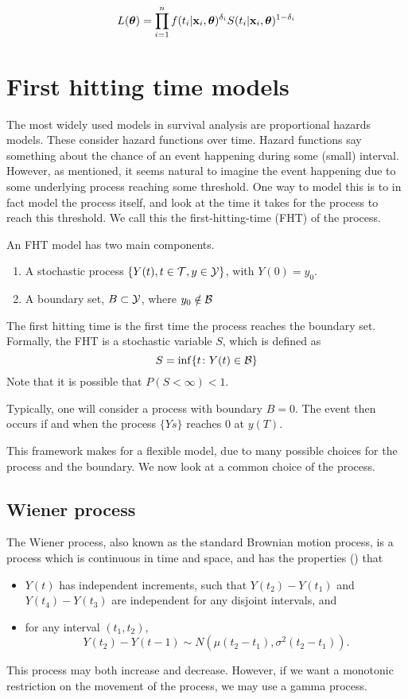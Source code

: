 \begin{equation}\label{eq:surv-lik}
    L(\boldsymbol{\theta})=\prod_{i=1}^n f(t_i|\mathbf{x}_i,\boldsymbol{\theta})^{\delta_i} S(t_i|\mathbf{x}_i,\boldsymbol{\theta})^{1-\delta_i}
\end{equation}

\section{First hitting time models}\label{sec:fht}
The most widely used models in survival analysis are proportional hazards models. These consider hazard functions over time. Hazard functions say something about the chance of an event happening during some (small) interval. However, as mentioned, it seems natural to imagine the event happening due to some underlying process reaching some threshold. One way to model this is to in fact model the process itself, and look at the time it takes for the process to reach this threshold. We call this the first-hitting-time (FHT) of the process.

An FHT model has two main components.
\begin{enumerate}
    \item A stochastic process $\{Y(t), t\in\mathcal{T},y\in\mathcal{Y}\}$, with $Y(0)=y_0$.
    \item A boundary set, $B\subset \mathcal{Y}$, where $y_0\notin\mathcal{B}$
\end{enumerate}
The first hitting time is the first time the process reaches the boundary set. Formally, the FHT is a stochastic variable $S$, which is defined as
\[
    S = \inf\{t\colon Y(t)\in\mathcal{B}\}
\]
Note that it is possible that $P(S<\infty)<1$.

Typically, one will consider a process with boundary $B=0$. The event then occurs if and when the process $\{Ys\}$ reaches 0 at $y(T)$.

This framework makes for a flexible model, due to many possible choices for the process and the boundary. We now look at a common choice of the process.

\subsection{Wiener process}\label{sec:wiener}
The Wiener process, also known as the standard Brownian motion process, is a process which is continuous in time and space, and has the properties (\cite[61]{caroni2017}) that
\begin{itemize}
    \item $Y(t)$ has independent increments, such that $Y(t_2)-Y(t_1)$ and $Y(t_4)-Y(t_3)$ are independent for any disjoint intervals, and
    \item for any interval $(t_1, t_2)$,
    \[
        Y(t_2)-Y(t-1)\sim N(\mu(t_2-t_1), \sigma^2(t_2-t_1)).
    \]
\end{itemize}
This process may both increase and decrease. However, if we want a monotonic restriction on the movement of the process, we may use a gamma process.

